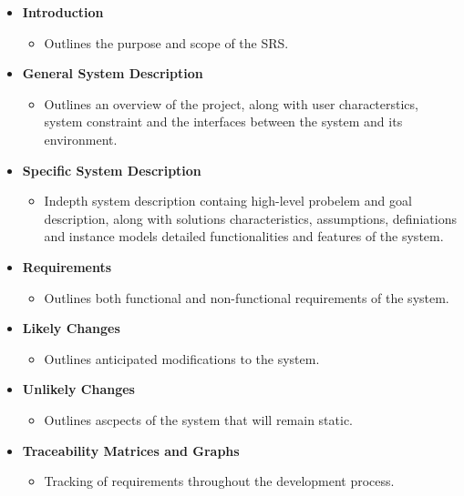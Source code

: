 \begin{itemize}
    \item \textbf{Introduction} 
    \begin{itemize}
        \item Outlines the purpose and scope of the SRS.
    \end{itemize}
    
    \item \textbf{General System Description} 
    \begin{itemize}
        \item Outlines an overview of the project, along with user characterstics, system constraint and the interfaces between the system and its environment.
    \end{itemize}
    
    \item \textbf{Specific System Description} 
    \begin{itemize}
        \item Indepth system description containg  high-level probelem and goal description, along with solutions characteristics, assumptions, definiations and instance models  detailed functionalities and features of the system.
    \end{itemize}
    
    \item \textbf{Requirements} 
    \begin{itemize}
        \item Outlines both functional and non-functional requirements of the system.
    \end{itemize}
    
    \item \textbf{Likely Changes} 
    \begin{itemize}
        \item Outlines anticipated modifications to the system.
    \end{itemize}
    
    \item \textbf{Unlikely Changes} 
    \begin{itemize}
        \item Outlines ascpects of the system that will remain static.
    \end{itemize}
    
    \item \textbf{Traceability Matrices and Graphs} 
    \begin{itemize}
        \item Tracking of requirements throughout the development process.
    \end{itemize}
    

\end{itemize}
